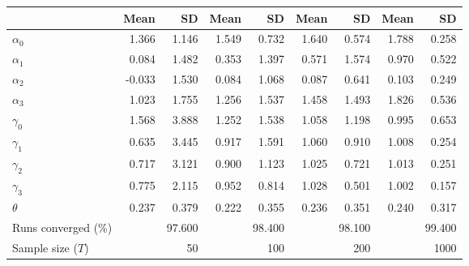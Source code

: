 
\begin{tabular}[t]{lrrrrrrrr}
\toprule
  & Mean & SD & Mean  & SD  & Mean   & SD   & Mean    & SD   \\
\midrule
$\alpha_{0}$ & 1.366 & 1.146 & 1.549 & 0.732 & 1.640 & 0.574 & 1.788 & 0.258\\
$\alpha_{1}$ & 0.084 & 1.482 & 0.353 & 1.397 & 0.571 & 1.574 & 0.970 & 0.522\\
$\alpha_{2}$ & -0.033 & 1.530 & 0.084 & 1.068 & 0.087 & 0.641 & 0.103 & 0.249\\
$\alpha_{3}$ & 1.023 & 1.755 & 1.256 & 1.537 & 1.458 & 1.493 & 1.826 & 0.536\\
$\gamma_{0}$ & 1.568 & 3.888 & 1.252 & 1.538 & 1.058 & 1.198 & 0.995 & 0.653\\
$\gamma_{1}$ & 0.635 & 3.445 & 0.917 & 1.591 & 1.060 & 0.910 & 1.008 & 0.254\\
$\gamma_{2}$ & 0.717 & 3.121 & 0.900 & 1.123 & 1.025 & 0.721 & 1.013 & 0.251\\
$\gamma_{3}$ & 0.775 & 2.115 & 0.952 & 0.814 & 1.028 & 0.501 & 1.002 & 0.157\\
$\theta$ & 0.237 & 0.379 & 0.222 & 0.355 & 0.236 & 0.351 & 0.240 & 0.317\\
Runs converged (\%) &  & 97.600 &  & 98.400 &  & 98.100 &  & 99.400\\
Sample size ($T$) &  & 50 &  & 100 &  & 200 &  & 1000\\
\bottomrule
\end{tabular}
